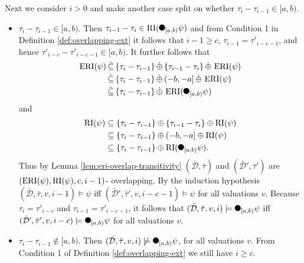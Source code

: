 \begin{itemize}
        Next we consider $i > 0$ and make another case split on whether $\tau_i - \tau_{i-1} \in [a,b)$.
        \begin{itemize}
            \item 
                $\tau_i - \tau_{i-1} \in [a,b)$.
                Then $\tau_{i-1} - \tau_i \in \RI(\Previous{[a,b)} \psi)$ and from Condition 1 in Definition \ref{def:overlapping-ext} it follows that $i-1 \geq c$, $\tau_{i-1} = \tau'_{i-c-1}$, and hence $\tau'_{i-c} - \tau'_{i-c-1} \in [a,b)$.
                It further follows that
                \begin{align*}
                    \ERI(\psi) 
                    &\subseteqmap \{\tau_i - \tau_{i-1} \} \oplusext \{ \tau_{i-1} - \tau_i \} \oplusext \ERI(\psi) \\
                    &\subseteqmap \{\tau_i - \tau_{i-1} \} \oplusext (-b, -a] \oplusext \ERI(\psi) \\
                    &\subseteqmap \{\tau_i - \tau_{i-1} \} \oplusext \ERI(\Previous{[a,b)} \psi)
                \end{align*}
                and
                \begin{align*}
                    \RI(\psi) 
                    &\subseteq \{\tau_i - \tau_{i-1} \} \oplus \{ \tau_{i-1} - \tau_i \} \oplus \RI(\psi) \\
                    &\subseteq \{\tau_i - \tau_{i-1} \} \oplus (-b, -a] \oplus \RI(\psi) \\
                    &\subseteq \{\tau_i - \tau_{i-1} \} \oplus \RI(\Previous{[a,b)} \psi).
                \end{align*}
                Thus by Lemma \ref{lem:eri-overlap-transitivity} $(\bar{\mathcal{D}}, \bar{\tau})$ and $(\bar{\mathcal{D}}', \bar{\tau}')$ are $(\operatorname{ERI}(\psi), \operatorname{RI}(\psi), c, i-1)$- overlapping.
                By the induction hypothesis $(\bar{\mathcal{D}}, \bar{\tau}, v, i-1) \models \psi$ iff $(\bar{\mathcal{D}}', \bar{\tau}', v, i-c-1) \models \psi$ for all valuations $v$.
                Because $\tau_i = \tau'_{i-c}$ and $\tau_{i-1} = \tau'_{i-c-1}$, it follows that $(\bar{\mathcal{D}}, \bar{\tau}, v, i) \models \Previous{[a,b)} \psi$ iff $(\bar{\mathcal{D}}', \bar{\tau}', v, i-c) \models \Previous{[a,b)} \psi$ for all valuations $v$.
            \item 
                $\tau_i - \tau_{i-1} \not\in [a,b)$.
                Then $(\bar{\mathcal{D}}, \bar{\tau}, v, i) \not\models \Previous{[a,b)} \psi$, for all valuations $v$.
                From Condition 1 of Definition \ref{def:overlapping-ext} we still have $i \geq c$.

\end{itemize}
\end{itemize}
